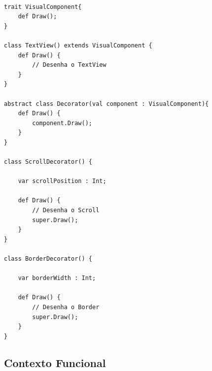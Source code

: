 \begin{lstlisting}[caption={Decorator Orientado a Objetos},label=oodecorator]

trait VisualComponent{
	def Draw();
}

class TextView() extends VisualComponent {
	def Draw() {
		// Desenha o TextView
	}
}

abstract class Decorator(val component : VisualComponent){
	def Draw() {
		component.Draw();
	}
}

class ScrollDecorator() {
	
	var scrollPosition : Int;

	def Draw() {
		// Desenha o Scroll
		super.Draw();
	}
}

class BorderDecorator() {
	
	var borderWidth : Int;

	def Draw() {
		// Desenha o Border
		super.Draw();
	}
}

\end{lstlisting}

\subsection*{Contexto Funcional}

\begin{lstlisting}[caption={Decorator Funcional},label=fpdecorator]
    

    
\end{lstlisting}